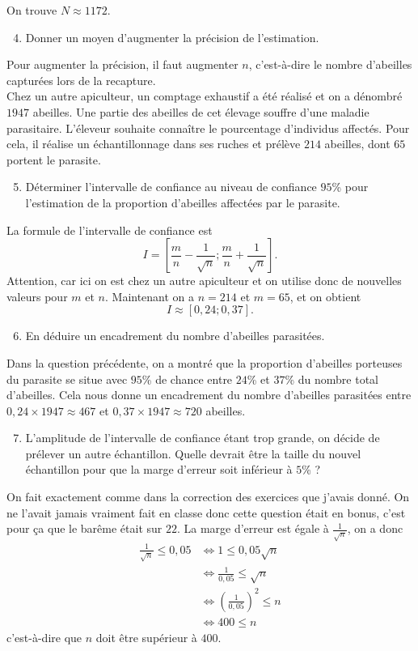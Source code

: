 \documentclass[11pt]{article}
\begin{document}
On trouve $N\approx1172$.
\begin{enumerate}
    \setcounter{enumi}{3}
  \item Donner un moyen d'augmenter la précision de l'estimation.
\end{enumerate}
Pour augmenter la précision, il faut augmenter $n$, c'est-à-dire le nombre
d'abeilles capturées lors de la recapture.\\[5mm]
\noindent Chez un autre apiculteur, un comptage exhaustif a été réalisé et on a dénombré
$1947$ abeilles. Une partie des abeilles de cet élevage souffre d'une maladie
parasitaire. L'éleveur souhaite connaître le pourcentage d'individus affectés.
Pour cela, il réalise un échantillonnage dans ses ruches et prélève $214$
abeilles, dont $65$ portent le parasite.
\begin{enumerate}
    \setcounter{enumi}{4}
  \item Déterminer l'intervalle de confiance au niveau de confiance $95$\% pour
    l'estimation de la proportion d'abeilles affectées par le parasite.
\end{enumerate}
La formule de l'intervalle de confiance est
\[
  I=\left[ \frac{m}{n}-\frac{1}{\sqrt n};\frac{m}{n}+\frac{1}{\sqrt n} \right].
\]
Attention, car ici on est chez un autre apiculteur et on utilise donc de
nouvelles valeurs pour $m$ et $n$. Maintenant on a $n=214$ et $m=65$, et on
obtient
\[
  I\approx\left[ 0,24; 0,37 \right].
\]
\begin{enumerate}
    \setcounter{enumi}{5}
  \item En déduire un encadrement du nombre d'abeilles parasitées.
\end{enumerate}
Dans la question précédente, on a montré que la proportion d'abeilles porteuses
du parasite se situe avec $95$\% de chance entre $24$\% et $37$\% du nombre
total d'abeilles. Cela nous donne un encadrement du nombre d'abeilles
parasitées entre $0,24\times1947\approx467$ et $0,37\times1947\approx720$
abeilles.
\begin{enumerate}
    \setcounter{enumi}{6}
  \item L'amplitude de l'intervalle de confiance étant trop grande, on décide de prélever un
    autre échantillon. Quelle devrait être la taille du nouvel échantillon pour
    que la marge d'erreur soit inférieur à $5$\% ?
\end{enumerate}
On fait exactement comme dans la correction des exercices que j'avais donné. On
ne l'avait jamais vraiment fait en classe donc cette question était en bonus,
c'est pour ça que le barême était sur $22$. La marge d'erreur est égale à
$\frac{1}{\sqrt n}$, on a donc
\begin{align*}
  \frac{1}{\sqrt n} \leq 0,05 &\Longleftrightarrow 1\leq0,05\sqrt n \\
  &\Longleftrightarrow\frac{1}{0,05}\leq\sqrt n \\
  &\Longleftrightarrow\left( \frac{1}{0,05} \right)^2\leq n \\
  &\Longleftrightarrow400\leq n
\end{align*}
c'est-à-dire que $n$ doit être supérieur à $400$.
\end{document}
